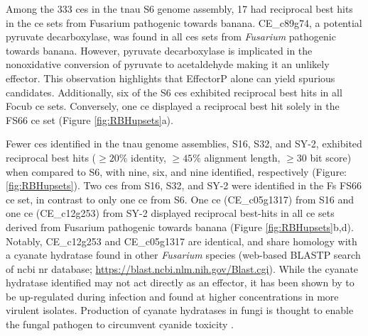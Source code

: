 Among the 333 \acp{ce} in the \ac{tnau} S6 genome assembly, 17 had reciprocal best hits in the \ac{ce} sets from Fusarium pathogenic towards banana. CE\_c89g74, a potential pyruvate decarboxylase, was found in all \acp{ce} sets from \textit{Fusarium}  pathogenic towards banana. However, pyruvate decarboxylase is implicated in the nonoxidative conversion of pyruvate to acetaldehyde \parencite{londono2017rhizopus} making it an unlikely effector. This observation highlights that EffectorP alone can yield spurious candidates. Additionally, six of the S6 \acp{ce} exhibited reciprocal best hits in all \ac{Focub} \ac{ce} sets. Conversely, one \ac{ce} displayed a reciprocal best hit solely in the FS66 \ac{ce} set (Figure \ref{fig:RBHupsets}a). 

Fewer \acp{ce} identified in the \ac{tnau} genome assemblies, S16, S32, and SY-2, exhibited reciprocal best hits ($\geq20\%$ identity, $\geq45\%$ alignment length, $\geq30$ bit score) when compared to S6, with nine, six, and nine identified, respectively (Figure: \ref{fig:RBHupsets}). Two \acp{ce} from S16, S32, and SY-2 were identified in the \ac{Fs} FS66 \ac{ce} set, in contrast to only one \ac{ce} from S6. One \ac{ce} (CE\_c05g1317) from S16 and one \ac{ce} (CE\_c12g253) from SY-2 displayed reciprocal best-hits in all \ac{ce} sets derived from Fusarium pathogenic towards banana (Figure \ref{fig:RBHupsets}b,d). Notably, CE\_c12g253 and CE\_c05g1317 are identical, and share homology with a cyanate hydratase found in other \textit{Fusarium} species (web-based BLASTP search of \ac{ncbi} nr database; \href{https://blast.ncbi.nlm.nih.gov/Blast.cgi}{https://blast.ncbi.nlm.nih.gov/Bla\-st.cgi}). While the cyanate hydratase identified may not act directly as an effector, it has been shown by \textcite{chittem2020transcriptome, prabhukarthikeyan2022comparative} to be up-regulated during infection and found at higher concentrations in more virulent isolates. Production of cyanate hydratases in fungi is thought to enable the fungal pathogen to circumvent cyanide toxicity \parencite{wang1992purification, malmir2022cyanide}.


